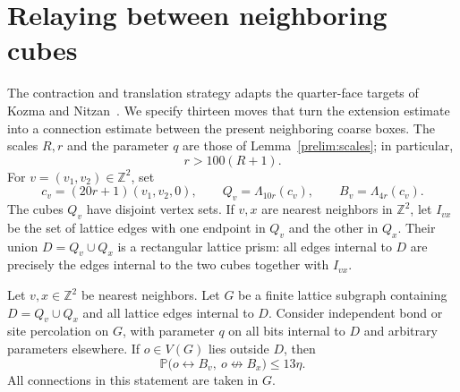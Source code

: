 \section{Relaying between neighboring cubes}\label{sec:geometry}

The contraction and translation strategy adapts the quarter-face targets
of Kozma and Nitzan~\cite[Section~4, Lemmas~11--12]{KozmaNitzan2024}.
We specify thirteen moves that turn the extension estimate into a connection
estimate between the present neighboring coarse boxes. The scales $R,r$ and the parameter $q$ are those of
Lemma~\ref{prelim:scales}; in particular,
\begin{equation}\label{geom:separation}
  r>100(R+1).
\end{equation}
For $v=(v_1,v_2)\in\mathbb Z^2$, set
\begin{equation}\label{geom:boxes}
  c_v=(20r+1)(v_1,v_2,0),\qquad
  Q_v=\Lambda_{10r}(c_v),\qquad
  B_v=\Lambda_{4r}(c_v).
\end{equation}
The cubes $Q_v$ have disjoint vertex sets. If $v,x$ are nearest neighbors in
$\mathbb Z^2$, let $I_{vx}$ be the set of lattice edges with one endpoint in
$Q_v$ and the other in $Q_x$. Their union $D=Q_v\cup Q_x$ is a rectangular
lattice prism: all edges internal to $D$ are precisely the edges internal to
the two cubes together with $I_{vx}$.

\begin{lemma}\label{geom:relay}
Let $v,x\in\mathbb Z^2$ be nearest neighbors. Let $G$ be a finite lattice
subgraph containing $D=Q_v\cup Q_x$ and all lattice edges internal to $D$.
Consider independent bond or site percolation on $G$, with parameter $q$ on
all bits internal to $D$ and arbitrary parameters elsewhere. If $o\in V(G)$
lies outside $D$, then
\begin{equation}\label{geom:relay-bound}
  \mathbb P\bigl(o\leftrightarrow B_v,\ o\not\leftrightarrow B_x\bigr)
  \le 13\eta.
\end{equation}
All connections in this statement are taken in $G$.
\end{lemma}

